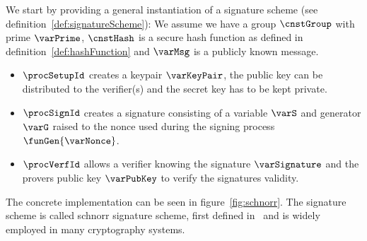 We start by providing a general instantiation of a signature scheme (see definition~\ref{def:signatureScheme}):
We assume we have a group $\cnstGroup$ with prime $\varPrime$, $\cnstHash$ is a secure hash function as defined in definition~\ref{def:hashFunction} and $\varMsg$ is a publicly known message.\\
\begin{itemize}
    \item $\procSetupId$ creates a keypair $\varKeyPair$, the public key can be distributed to the verifier(s) and the secret key has to be kept private. \\
    \item $\procSignId$ creates a signature consisting of a variable $\varS$ and generator $\varG$ raised to the nonce used during the signing process $\funGen{\varNonce}$. \\
    \item $\procVerfId$ allows a verifier knowing the signature $\varSignature$ and the provers public key $\varPubKey$ to verify the signatures validity. \\
\end{itemize}
The concrete implementation can be seen in figure~\ref{fig:schnorr}. The signature scheme is called schnorr signature scheme, first defined in~\cite{schnorr1989efficient} and is widely employed in many cryptography systems.
